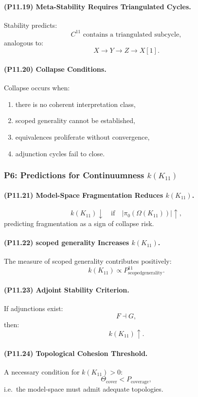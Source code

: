 \paragraph{(P11.19) Meta-Stability Requires Triangulated Cycles.}
Stability predicts:
\[
C^{11} \text{ contains a triangulated subcycle},
\]
analogous to:
\[
X \to Y \to Z \to X[1].
\]

\paragraph{(P11.20) Collapse Conditions.}
Collapse occurs when:
\begin{enumerate}
    \item there is no coherent interpretation class,
    \item scoped generality cannot be established,
    \item equivalences proliferate without convergence,
    \item adjunction cycles fail to close.
\end{enumerate}

\subsubsection{P6: Predictions for Continuumness $k(K_{11})$}

\paragraph{(P11.21) Model-Space Fragmentation Reduces $k(K_{11})$.}
\[
k(K_{11}) \downarrow \quad\text{if}\quad
|\pi_0(\Omega(K_{11}))| \uparrow,
\]
predicting fragmentation as a sign of collapse risk.

\paragraph{(P11.22) scoped generality Increases $k(K_{11})$.}
The measure of scoped generality contributes positively:
\[
k(K_{11}) \propto
P_{\mathrm{scoped generality}}^{11}.
\]

\paragraph{(P11.23) Adjoint Stability Criterion.}
If adjunctions exist:
\[
F \dashv G,
\]
then:
\[
k(K_{11}) \uparrow.
\]

\paragraph{(P11.24) Topological Cohesion Threshold.}
A necessary condition for $k(K_{11}) > 0$:
\[
\Theta_{\mathrm{cover}} < P_{\mathrm{coverage}},
\]
i.e.\ the model-space must admit adequate topologies.

